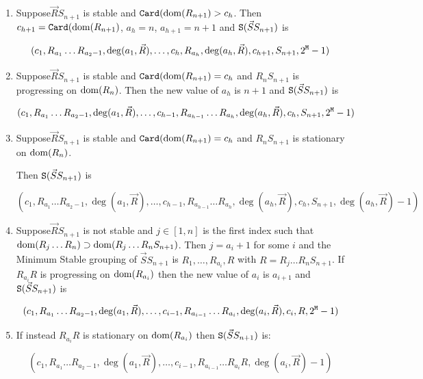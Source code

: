 \documentclass{lmcs}
\begin{document}
\begin{enumerate}
\item
Suppose$ \vec{R}S_{n+1}$ is stable and ${\tt Card}({\rm dom}(R_{n+1})> c_h$. Then
$c_{h+1} = {\tt Card}({\rm dom}(R_{n+1})$, $a_h = n$, $a_{h+1} = n+1$ and 
${\tt S}(\vec{S}S_{n+1})$ is 

$$
(c_1, R_{a_1}\ldots R_{a_2-1}, \deg(a_1,\vec{R}), 
\ldots,
c_h, R_{a_h}, \deg(a_h,\vec{R}),
c_{h+1}, S_{n+1}, 2^{{\tt M}} - 1)
$$

\item
Suppose$ \vec{R}S_{n+1}$ is stable and ${\tt Card}({\rm dom}(R_{n+1})= c_h$
and $R_n S_{n+1}$ is progressing on ${\rm dom}(R_{n})$.
Then the new value of $a_h$ is $n+1$ and ${\tt S}(\vec{S}S_{n+1})$ is 

$$
(c_1, R_{a_1}\ldots R_{a_2-1}, \deg(a_1,\vec{R}), 
\ldots,
c_{h-1}, R_{a_{h-1}}\ldots R_{a_h}, \deg(a_h,\vec{R}),
c_{h}, S_{n+1}, 2^{{\tt M}} - 1)
$$

\item
Suppose$ \vec{R}S_{n+1}$ is stable and ${\tt Card}({\rm dom}(R_{n+1})= c_h$
and $R_n S_{n+1}$ is stationary on ${\rm dom}(R_{n})$.

Then ${\tt S}(\vec{S}S_{n+1})$ is 

$$
(c_1, R_{a_1}\ldots R_{a_2-1}, \deg(a_1,\vec{R}), 
\ldots,
c_{h-1}, R_{a_{h-1}}\ldots R_{a_h}, \deg(a_h,\vec{R}),
c_{h}, S_{n+1}, \deg(a_h,\vec{R}) - 1)
$$

\item
Suppose$ \vec{R}S_{n+1}$ is not stable and $j \in [1,n]$ is the first index
such that ${\rm dom}(R_j \ldots R_n) \supset {\rm dom}(R_j \ldots R_n S_{n+1})$.
Then $j = a_i + 1$ for some $i$ and the Minimum Stable grouping of $\vec{S}S_{n+1}$
is $R_1, \ldots, R_{a_i}, R$ with $R = R_j \ldots R_n S_{n+1}$. If $R_{a_i} R$
is progressing on ${\rm dom}(R_{a_i})$ then the new value of $a_i$ is
$a_{i+1}$ and ${\tt S}(\vec{S}S_{n+1})$ is 

$$
(c_1, R_{a_1}\ldots R_{a_2-1}, \deg(a_1,\vec{R}), 
\ldots,
c_{i-1}, R_{a_{i-1}}\ldots R_{a_i}, \deg(a_i,\vec{R}),
c_{i}, R, 2^{{\tt M}}-1)
$$

\item
If instead $R_{a_i} R$
is stationary on ${\rm dom}(R_{a_i})$ then ${\tt S}(\vec{S}S_{n+1})$ is:

$$
(c_1, R_{a_1}\ldots R_{a_2-1}, \deg(a_1,\vec{R}), 
\ldots,
c_{i-1}, R_{a_{i-1}}\ldots R_{a_i}R, \deg(a_i,\vec{R})-1)
$$

\end{enumerate}
\end{document}
